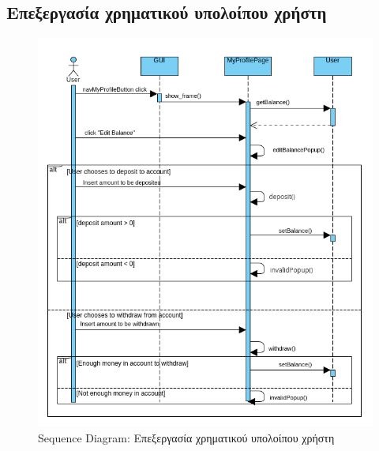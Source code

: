 \documentclass[12pt,a4paper]{article}
\begin{document}
\subsection{Επεξεργασία χρηματικού υπολοίπου χρήστη}
\begin{figure}[H]
	\includegraphics[width=\textwidth]{Edit User Balance Sequence.png}
	\caption{Sequence Diagram: Επεξεργασία χρηματικού υπολοίπου χρήστη}
	\label{Sequence Diagram: Επεξεργασία χρηματικού υπολοίπου χρήστη}
\end{figure}
\end{document}
